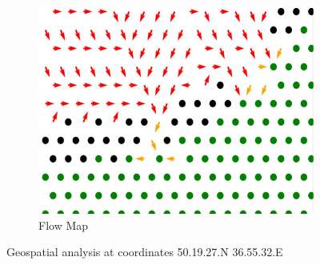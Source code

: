 \begin{figure}[htbp]
\begin{subfigure}[b]{0.32\textwidth}
    \includegraphics[width=\textwidth]{figs/Thomas/Return To Safety/50.19.27.N 36.55.32.E Flow.png}
    \caption{Flow Map}
    \label{fig:cost map flow}
  \end{subfigure}
  
  \caption{Geospatial analysis at coordinates 50.19.27.N 36.55.32.E}
  \label{fig:cost map net}
\end{figure}